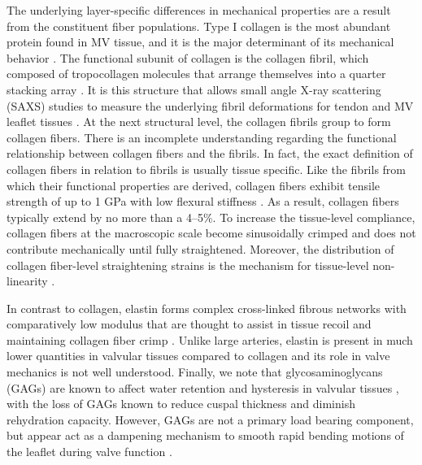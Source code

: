     
    The underlying layer-specific differences in mechanical properties are a result from the constituent fiber populations. Type I collagen is the most abundant protein found in MV tissue, and it is the major determinant of its mechanical behavior \cite{parry_molecular_1988,gelse_collagens_2003}. The functional subunit of collagen is the collagen fibril, which composed of tropocollagen molecules that arrange themselves into a quarter stacking array \cite{parry_molecular_1988,gelse_collagens_2003}. It is this structure that allows small angle X-ray scattering (SAXS) studies to measure the underlying fibril deformations for tendon \cite{sasaki_elongation_1996,sasaki_stress_1996} and MV leaflet tissues \cite{liao_relation_2007}. At the next structural level, the collagen fibrils group to form collagen fibers. There is an incomplete understanding regarding the functional relationship between collagen fibers and the fibrils. In fact, the exact definition of collagen fibers in relation to fibrils is usually tissue specific. Like the fibrils from which their functional properties are derived, collagen fibers exhibit tensile strength of up to 1 GPa \cite{shen_stress_2008,gentleman_mechanical_2003,eppell_nano_2006,yang_mechanical_2008,sacks_biomechanics_2009} with low flexural stiffness \cite{sacks_biomechanics_2009}. As a result, collagen fibers typically extend by no more than a 4–5\%. To increase the tissue-level compliance, collagen fibers at the macroscopic scale become sinusoidally crimped \cite{parry_molecular_1988} and does not contribute mechanically until fully straightened. Moreover, the distribution of collagen fiber-level straightening strains is the mechanism for tissue-level non-linearity \cite{lanir_constitutive_1983,sacks_multiaxial_2003}. 
    
    
    In contrast to collagen, elastin forms complex cross-linked fibrous networks with comparatively low modulus that are thought to assist in tissue recoil \cite{debelle_elastin_1999,debelle_structures_1999} and maintaining collagen fiber crimp \cite{vesely_comparison_1998,scott_aortic_1995}. Unlike large arteries, elastin is present in much lower quantities in valvular tissues compared to collagen \cite{sacks_biomechanics_2009,vesely_comparison_1998,lis_biochemical_1987,stella_biaxial_2007} and its role in valve mechanics is not well understood. Finally, we note that glycosaminoglycans (GAGs) are known to affect water retention and hysteresis in valvular tissues \cite{lovekamp_stability_2006,eckert_biomechanical_2013}, with the loss of GAGs known to reduce cuspal thickness and diminish rehydration capacity. However, GAGs are not a primary load bearing component, but appear act as a dampening mechanism to smooth rapid bending motions of the leaflet during valve function \cite{eckert_biomechanical_2013}.
    

